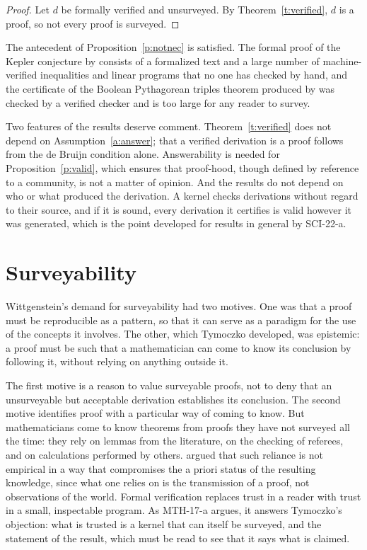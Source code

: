 \documentclass{situationist-preprint}
\begin{document}
\begin{proof}
Let $d$ be formally verified and unsurveyed. By Theorem~\ref{t:verified}, $d$ is a proof, so not every proof is surveyed.
\end{proof}

The antecedent of Proposition~\ref{p:notnec} is satisfied. The formal proof of the Kepler conjecture by \citet{HalesEtAl2017} consists of a formalized text and a large number of machine-verified inequalities and linear programs that no one has checked by hand, and the certificate of the Boolean Pythagorean triples theorem produced by \citet{HeuleEtAl2016} was checked by a verified checker and is too large for any reader to survey.

Two features of the results deserve comment. Theorem~\ref{t:verified} does not depend on Assumption~\ref{a:answer}; that a verified derivation is a proof follows from the de Bruijn condition alone. Answerability is needed for Proposition~\ref{p:valid}, which ensures that proof-hood, though defined by reference to a community, is not a matter of opinion. And the results do not depend on who or what produced the derivation. A kernel checks derivations without regard to their source, and if it is sound, every derivation it certifies is valid however it was generated, which is the point developed for results in general by SCI-22-a.

\section{Surveyability}

Wittgenstein's demand for surveyability had two motives. One was that a proof must be reproducible as a pattern, so that it can serve as a paradigm for the use of the concepts it involves. The other, which Tymoczko developed, was epistemic: a proof must be such that a mathematician can come to know its conclusion by following it, without relying on anything outside it.

The first motive is a reason to value surveyable proofs, not to deny that an unsurveyable but acceptable derivation establishes its conclusion. The second motive identifies proof with a particular way of coming to know. But mathematicians come to know theorems from proofs they have not surveyed all the time: they rely on lemmas from the literature, on the checking of referees, and on calculations performed by others. \citet{Burge1998} argued that such reliance is not empirical in a way that compromises the a priori status of the resulting knowledge, since what one relies on is the transmission of a proof, not observations of the world. Formal verification replaces trust in a reader with trust in a small, inspectable program. As MTH-17-a argues, it answers Tymoczko's objection: what is trusted is a kernel that can itself be surveyed, and the statement of the result, which must be read to see that it says what is claimed.
\end{document}
